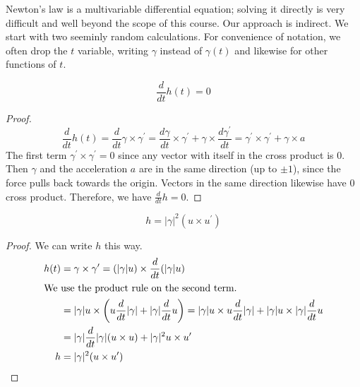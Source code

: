 \documentclass[fleqn,letterpaper]{report}
\begin{document}
Newton's law is a multivariable differential equation; solving
it directly is very difficult and well beyond the scope of
this course. Our approach is indirect. We start with two
seeminly random calculations. For convenience of notation, we
often drop the $t$ variable, writing $\gamma$ instead of
$\gamma(t)$ and likewise for other functions of $t$.

\begin{lem}
\label{lemma-reference1}
\begin{equation*}
\frac{d}{dt} h(t) = 0
\end{equation*}
\end{lem}

\begin{proof}
\begin{equation*}
\frac{d}{dt} h(t) = \frac{d}{dt} \gamma \times \gamma^\prime =
\frac{d\gamma}{dt} \times \gamma^\prime + \gamma \times
\frac{d\gamma^\prime}{dt} 
= \gamma^\prime \times \gamma^\prime + \gamma \times a 
\end{equation*}
The first term $\gamma^\prime \times \gamma^\prime = 0$ since
any vector with itself in the cross product is $0$. Then
$\gamma$ and the acceleration $a$ are in the same direction
(up to $\pm1$), since the force pulls back towards the origin.
Vectors in the same direction likewise have $0$ cross product.
Therefore, we have $\frac{d}{dt} h = 0$. 
\end{proof}

\begin{lem}
\label{lemma-reference2}
\begin{equation*}
h = |\gamma|^2 (u \times u^\prime)
\end{equation*}
\end{lem}

\begin{proof}
We can write $h$ this way.
\begin{align*}
h(t) & = \gamma \times \gamma^\prime =
(|\gamma|u) \times \frac{d}{dt} (|\gamma| u) \\
\intertext{We use the product rule on the second term.}
& = |\gamma| u \times \left( u \frac{d}{dt} |\gamma| + |\gamma|
\frac{d}{dt} u \right) 
= |\gamma| u \times u \frac{d}{dt} |\gamma| + |\gamma| u
\times |\gamma| \frac{d}{dt} u \\
& = |\gamma| \frac{d}{dt} |\gamma| (u \times u ) + |\gamma|^2
u \times u^\prime \\
h & = |\gamma|^2 (u \times u^\prime) 
\end{align*}
\end{proof}
\end{document}
